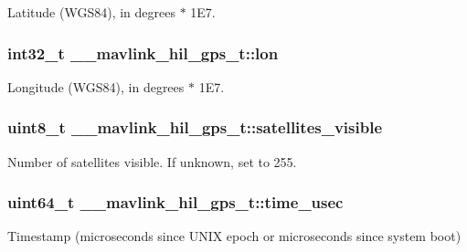 Latitude (W\+G\+S84), in degrees $\ast$ 1\+E7. 

\hypertarget{struct____mavlink__hil__gps__t_abfec6d143d48f5b7e5e37cd8c98d6f82}{
\subsubsection[{lon}]{\setlength{\rightskip}{0pt plus 5cm}int32\+\_\+t \+\_\+\+\_\+mavlink\+\_\+hil\+\_\+gps\+\_\+t\+::lon}}\label{struct____mavlink__hil__gps__t_abfec6d143d48f5b7e5e37cd8c98d6f82}


Longitude (W\+G\+S84), in degrees $\ast$ 1\+E7. 

\hypertarget{struct____mavlink__hil__gps__t_a9128f6bd8c708d5990adbfce55365577}{
\subsubsection[{satellites\+\_\+visible}]{\setlength{\rightskip}{0pt plus 5cm}uint8\+\_\+t \+\_\+\+\_\+mavlink\+\_\+hil\+\_\+gps\+\_\+t\+::satellites\+\_\+visible}}\label{struct____mavlink__hil__gps__t_a9128f6bd8c708d5990adbfce55365577}


Number of satellites visible. If unknown, set to 255. 

\hypertarget{struct____mavlink__hil__gps__t_a06069c8971366092665b51a939e9abb3}{
\subsubsection[{time\+\_\+usec}]{\setlength{\rightskip}{0pt plus 5cm}uint64\+\_\+t \+\_\+\+\_\+mavlink\+\_\+hil\+\_\+gps\+\_\+t\+::time\+\_\+usec}}\label{struct____mavlink__hil__gps__t_a06069c8971366092665b51a939e9abb3}


Timestamp (microseconds since U\+N\+I\+X epoch or microseconds since system boot) 

